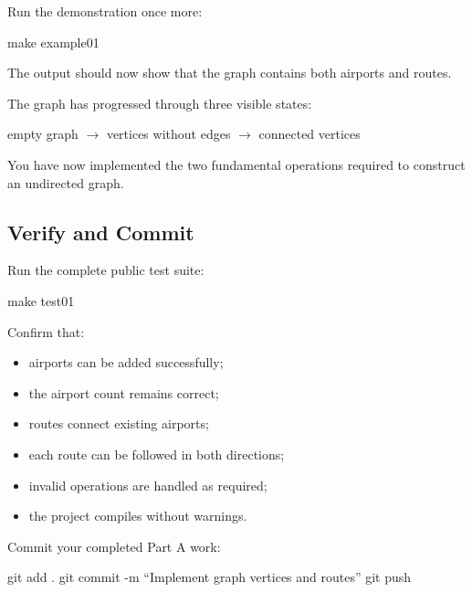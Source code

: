 \documentclass{csc2059practical}
\begin{document}
Run the demonstration once more:

\begin{terminal}
make example01
\end{terminal}

The output should now show that the graph contains both airports and routes.

The graph has progressed through three visible states:

\begin{center}
empty graph
$\rightarrow$
vertices without edges
$\rightarrow$
connected vertices
\end{center}

You have now implemented the two fundamental operations required to construct
an undirected graph.


\subsection{Verify and Commit}

Run the complete public test suite:

\begin{terminal}
make test01
\end{terminal}

Confirm that:

\begin{itemize}
\item airports can be added successfully;
\item the airport count remains correct;
\item routes connect existing airports;
\item each route can be followed in both directions;
\item invalid operations are handled as required;
\item the project compiles without warnings.
\end{itemize}

Commit your completed Part A work:

\begin{terminal}
git add .
git commit -m “Implement graph vertices and routes”
git push
\end{terminal}

\clearpage
\end{document}

